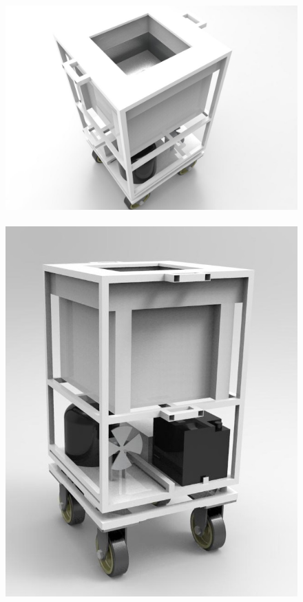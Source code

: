 \begin{figure}[H]
	\centering
	\includegraphics[width=\textwidth]{figuras/render_1.jpg}\
	\includegraphics[scale=.5]{figuras/render_2.jpg}\

\end{figure}
